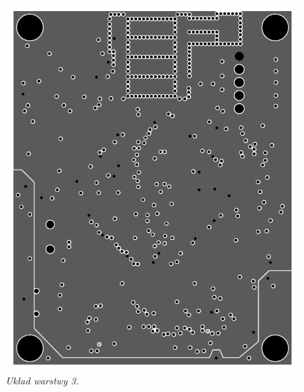 \documentclass[eng,printmode]{mgr}
\begin{document}
\begin{center}\centering
\begin{figure}[!h]
\vskip 2cm
    \centering
    \label{fig:power}
    \includegraphics[width=\textwidth]{pcb/power.png}
    \caption{\textit{\scriptsize Układ warstwy 3.}}
\end{figure}
\end{center}
\end{document}
